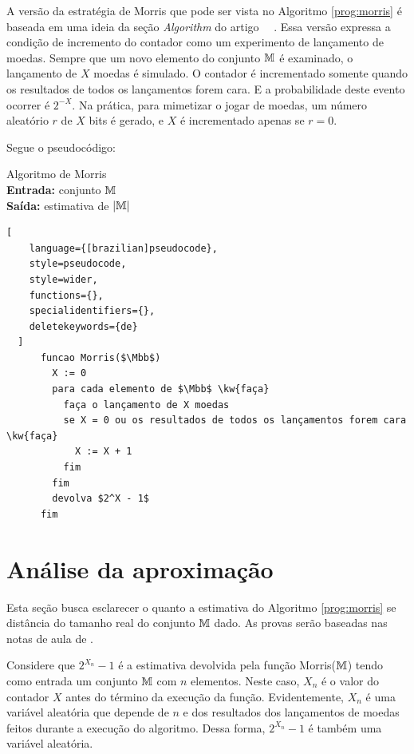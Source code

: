 A versão da estratégia de Morris que pode ser vista no Algoritmo \ref{prog:morris}
é baseada em uma ideia da seção \textit{Algorithm} do artigo ~~\citep{ApproximateCountingAlgorithm}.
Essa versão expressa a condição de incremento do contador como um experimento de lançamento de moedas. 
Sempre que um novo elemento do conjunto $\mathbb{M}$ é examinado, o lançamento de $X$ moedas é simulado. 
O contador é incrementado somente quando os resultados de todos os lançamentos forem cara.
E a probabilidade deste evento ocorrer é $2^{-X}$. Na prática, para mimetizar o jogar de moedas, 
um número aleatório $r$ de $X$ bits é gerado, e $X$ é incrementado apenas se $r = 0$.

Segue o pseudocódigo:
\begin{programruledcaption}{
Algoritmo de Morris\label{prog:morris}
\\ \textbf{Entrada:} conjunto $\mathbb{M}$
\\ \textbf{Saída:} estimativa de $|\mathbb{M}|$
\label{prog:flajolet-martin}
}
  \begin{lstlisting}[
    language={[brazilian]pseudocode},
    style=pseudocode,
    style=wider,
    functions={},
    specialidentifiers={},
    deletekeywords={de}
  ]
      funcao Morris($\Mbb$) 
        X := 0
        para cada elemento de $\Mbb$ \kw{faça}
          faça o lançamento de X moedas
          se X = 0 ou os resultados de todos os lançamentos forem cara \kw{faça}
            X := X + 1
          fim
        fim
        devolva $2^X - 1$
      fim
  \end{lstlisting}
\end{programruledcaption}

\section{Análise da aproximação}
\label{sec:morris:analysis}

Esta seção busca esclarecer o quanto a estimativa do Algoritmo \ref{prog:morris} se distância do tamanho real do conjunto $\mathbb{M}$ dado. As provas
serão baseadas nas notas de aula de \citep{LectureNotesAndoni}.

Considere que $2^{X_n} - 1$ é a estimativa devolvida pela função Morris($\mathbb{M}$) tendo como entrada um conjunto $\mathbb{M}$ com $n$ elementos.
Neste caso, $X_n$ é o valor do contador $X$ antes do término da execução da função.
Evidentemente, $X_n$ é uma variável aleatória que depende de $n$ e dos resultados dos lançamentos de moedas feitos durante a execução do algoritmo.
Dessa forma, $2^{X_n} - 1$ é também uma variável aleatória.

